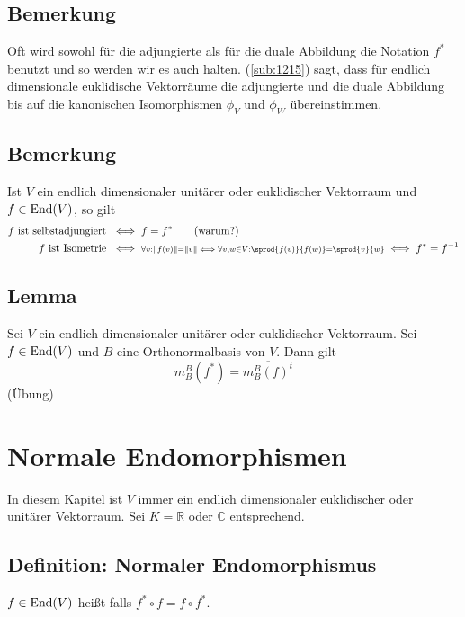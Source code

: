 \subsection{Bemerkung} %
\label{sub:1216}
Oft wird sowohl für die adjungierte als für die duale Abbildung die Notation $f^*$ benutzt und so werden wir es auch halten. (\ref{sub:1215}) sagt, dass für 
endlich dimensionale euklidische Vektorräume die adjungierte und die duale Abbildung bis auf die kanonischen Isomorphismen $\phi_V$ und $\phi_W$ übereinstimmen.

\subsection[Bemerkung: Charakterisierung von selbstadjungierten Endomorphismen und Isometrien durch $f^*$]{Bemerkung} %
\label{sub:1217}
Ist $V$ ein endlich dimensionaler unitärer oder euklidischer Vektorraum und $f \in \operatorname{End}(V)$, so gilt
\begin{align*}
	f \text{ ist selbstadjungiert } &\iff f = f^* \tag{warum?} \\
	f \text{ ist Isometrie }& \iff {\scriptstyle\forall v: \norm{f(v)}= \norm{v} \iff \forall v,w \in V : \sprod{f(v)}{f(w)} = \sprod{v}{w}} \iff f^* = f ^{-1}  
\end{align*}

\subsection[Lemma: Vergleich der Matrizen von $f$ und $f^*$]{Lemma} %
\label{sub:1218}
Sei $V$ ein endlich dimensionaler unitärer oder euklidischer Vektorraum. Sei $f \in \operatorname{End}(V)$ und $B$ eine Orthonormalbasis von $V$. Dann gilt
\[
	m_B^B (f^*) = \overline{m_B^B(f)^t} 
\]
(Übung)
\newpage
\section{Normale Endomorphismen} %
\label{sec:13}
In diesem Kapitel ist $V$ immer ein endlich dimensionaler euklidischer oder unitärer Vektorraum. Sei $K=\mathds{R}$ oder $\mathds{C}$ entsprechend.

\subsection{Definition: Normaler Endomorphismus} %
\label{sub:131}
$f \in \operatorname{End}(V)$ heißt  falls $f^* \circ f = f \circ f^*$. 


